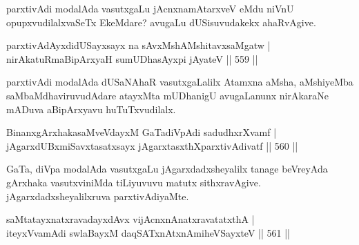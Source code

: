 \begin{artha}
parxtivAdi modalAda vasutxgaLu jAcnxnamAtarxveV eMdu niVnU opupxvudilalxvaSeTx EkeMdare? avugaLu dUSisuvudakekx ahaRvAgive.
\end{artha}


\begin{shl}
parxtivAdAyxdidUSayxsayx na \footnotemark[1]sAvxMshAMshitavxsaMgatw | \\
nirAkatuRmaBipArxyaH \footnotemark[2]sumUDhasAyxpi jAyateV \hfill||  559 ||  
\end{shl}

\begin{artha}
parxtivAdi modalAda dUSaNAhaR vasutxgaLalilx Atamxna aMsha, aMshiyeMba saMbaMdhaviruvudAdare atayxMta mUDhanigU avugaLanunx nirAkaraNe mADuva aBipArxyavu huTuTxvudilalx.
\end{artha}


\begin{shl}
\footnotemark[3]BinanxgArxhakasaMveVdayxM GaTadiVpAdi sadudhxrXvamf | \\
jAgarxdUBxmiSavxtasatxsayx jAgarxtasxthXparxtivAdivatf \hfill||  560 ||  
\end{shl}

\begin{artha}
GaTa, diVpa modalAda vasutxgaLu jAgarxdadxsheyalilx tanage beVreyAda gArxhaka vasutxviniMda tiLiyuvuvu matutx sithxravAgive. jAgarxdadxsheyalilxruva parxtivAdiyaMte.
\end{artha}

\begin{shl}
saMtatayxnatxravadayxdAvx vijAcnxnAnatxravatatxthA | \\
iteyxVvamAdi swlaBayxM daqSATxnAtxnAmiheVSayxteV \hfill||  561 ||  
\end{shl}

